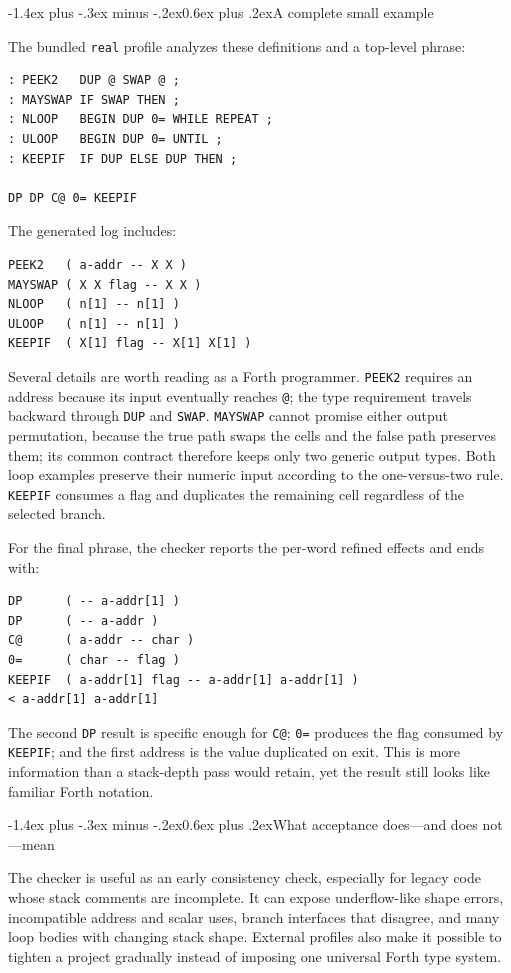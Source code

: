 \documentclass[a4paper,10pt]{article}
\makeatletter
\renewcommand\section{\@startsection{section}{1}{\z@}%
  {-1.4ex plus -.3ex minus -.2ex}{0.6ex plus .2ex}{\large\bfseries}}
\makeatother
\begin{document}
\section{A complete small example}

The bundled \texttt{real} profile analyzes these definitions and a top-level
phrase:
\begin{lstlisting}
: PEEK2   DUP @ SWAP @ ;
: MAYSWAP IF SWAP THEN ;
: NLOOP   BEGIN DUP 0= WHILE REPEAT ;
: ULOOP   BEGIN DUP 0= UNTIL ;
: KEEPIF  IF DUP ELSE DUP THEN ;

DP DP C@ 0= KEEPIF
\end{lstlisting}
The generated log includes:
\begin{lstlisting}
PEEK2   ( a-addr -- X X )
MAYSWAP ( X X flag -- X X )
NLOOP   ( n[1] -- n[1] )
ULOOP   ( n[1] -- n[1] )
KEEPIF  ( X[1] flag -- X[1] X[1] )
\end{lstlisting}
Several details are worth reading as a Forth programmer.  \texttt{PEEK2}
requires an address because its input eventually reaches \texttt{@}; the type
requirement travels backward through \texttt{DUP} and \texttt{SWAP}.
\texttt{MAYSWAP} cannot promise either output permutation, because the true
path swaps the cells and the false path preserves them; its common contract
therefore keeps only two generic output types.  Both loop examples preserve
their numeric input according to the one-versus-two rule.  \texttt{KEEPIF}
consumes a flag and duplicates the remaining cell regardless of the selected
branch.

For the final phrase, the checker reports the per-word refined effects and
ends with:
\begin{lstlisting}
DP      ( -- a-addr[1] )
DP      ( -- a-addr )
C@      ( a-addr -- char )
0=      ( char -- flag )
KEEPIF  ( a-addr[1] flag -- a-addr[1] a-addr[1] )
< a-addr[1] a-addr[1]
\end{lstlisting}
The second \texttt{DP} result is specific enough for \texttt{C@}; \texttt{0=}
produces the flag consumed by \texttt{KEEPIF}; and the first address is the
value duplicated on exit.  This is more information than a stack-depth pass
would retain, yet the result still looks like familiar Forth notation.

\section{What acceptance does---and does not---mean}

The checker is useful as an early consistency check, especially for legacy
code whose stack comments are incomplete.  It can expose underflow-like shape
errors, incompatible address and scalar uses, branch interfaces that disagree,
and many loop bodies with changing stack shape.  External profiles also make
it possible to tighten a project gradually instead of imposing one universal
Forth type system.
\end{document}
